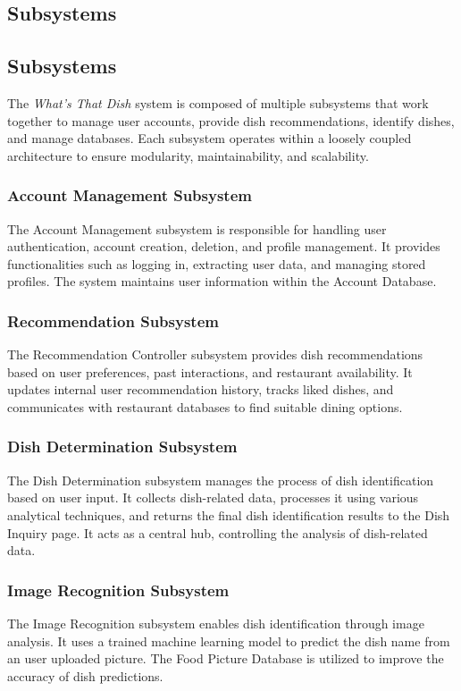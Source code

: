\documentclass[]{article}
\begin{document}
\subsection{Subsystems}
\label{sub:subsystems}
\subsection{Subsystems}

The \textit{What’s That Dish} system is composed of multiple subsystems that work together to manage user accounts, provide dish recommendations, identify dishes, and manage databases. Each subsystem operates within a loosely coupled architecture to ensure modularity, maintainability, and scalability.

\subsubsection{Account Management Subsystem}
The Account Management subsystem is responsible for handling user authentication, account creation, deletion, and profile management. It provides functionalities such as logging in, extracting user data, and managing stored profiles. The system maintains user information within the Account Database.

\subsubsection{Recommendation Subsystem}
The Recommendation Controller subsystem provides dish recommendations based on user preferences, past interactions, and restaurant availability. It updates internal user recommendation history, tracks liked dishes, and communicates with restaurant databases to find suitable dining options.

\subsubsection{Dish Determination Subsystem}
The Dish Determination subsystem manages the process of dish identification based on user input. It collects dish-related data, processes it using various analytical techniques, and returns the final dish identification results to the Dish Inquiry page. It acts as a central hub, controlling the analysis of dish-related data.


\subsubsection{Image Recognition Subsystem}
The Image Recognition subsystem enables dish identification through image analysis. It uses a trained machine learning model to predict the dish name from an user uploaded picture. The Food Picture Database is utilized to improve the accuracy of dish predictions.
\end{document}
